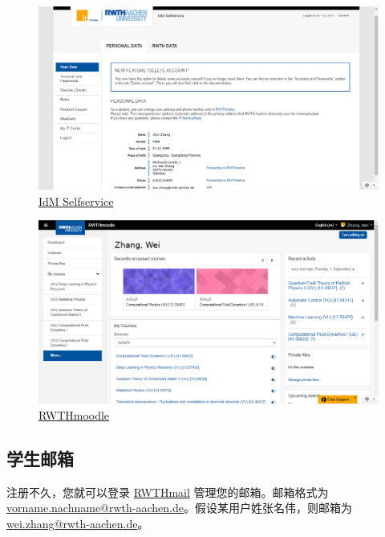     \begin{figure}[H]
      \centering
      \includegraphics[width=\textwidth]{初来乍到/Management_System/idm.png}
      \caption{\href{https://idm.rwth-aachen.de/selfservice}{IdM Selfservice}}
      \label{fig:IdM Selfservice}
    \end{figure}

    \begin{figure}[H]
      \centering
      \includegraphics[width=\textwidth]{初来乍到/Management_System/RWTHmoodle.png}
      \caption{\href{https://moodle.rwth-aachen.de/}{RWTHmoodle}}
      \label{fig:RWTHmoodle}
    \end{figure}

  \subsection{学生邮箱}\label{subsec:学生邮箱}

    注册不久，您就可以登录 \href{https://mail.rwth-aachen.de/}{RWTHmail} 管理您的邮箱。邮箱格式为 \href{mailto:vorname.nachname@rwth-aachen.de}{vorname.nachname@rwth-aachen.de}。假设某用户姓张名伟，则邮箱为 \href{mailto:wei.zhang@rwth-aachen.de}{wei.zhang@rwth-aachen.de}。

